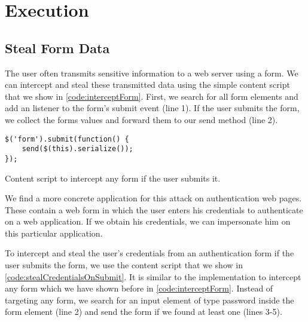 	


\clearpage
\section{Execution}
\label{sec:execution}
	

\subsection{Steal Form Data}

	The user often transmits sensitive information to a web server using a form. We can intercept and steal these transmitted data using the simple content script that we show in \autoref{code:interceptForm}. First, we search for all form elements and add an listener to the form's submit event (line 1). If the user submits the form, we collect the forms values and forward them to our send method (line 2).
	
	\begin{code}
		\begin{lstlisting}
$('form').submit(function() {
	send($(this).serialize());
});
		\end{lstlisting}
		\caption{Content script to intercept any form if the user submits it.}
		\label{code:interceptForm}
	\end{code}
	
	We find a more concrete application for this attack on authentication web pages. These contain a web form in which the user enters his credentials to authenticate on a web application. If we obtain his credentials, we can impersonate him on this particular application. 
	
	To intercept and steal the user's credentials from an authentication form if the user submits the form, we use the content script that we show in \autoref{code:stealCredentialsOnSubmit}. It is similar to the implementation to intercept any form which we have shown before in \autoref{code:interceptForm}. Instead of targeting any form, we search for an input element of type password inside the form element (line 2) and send the form if we found at least one (lines 3-5).


